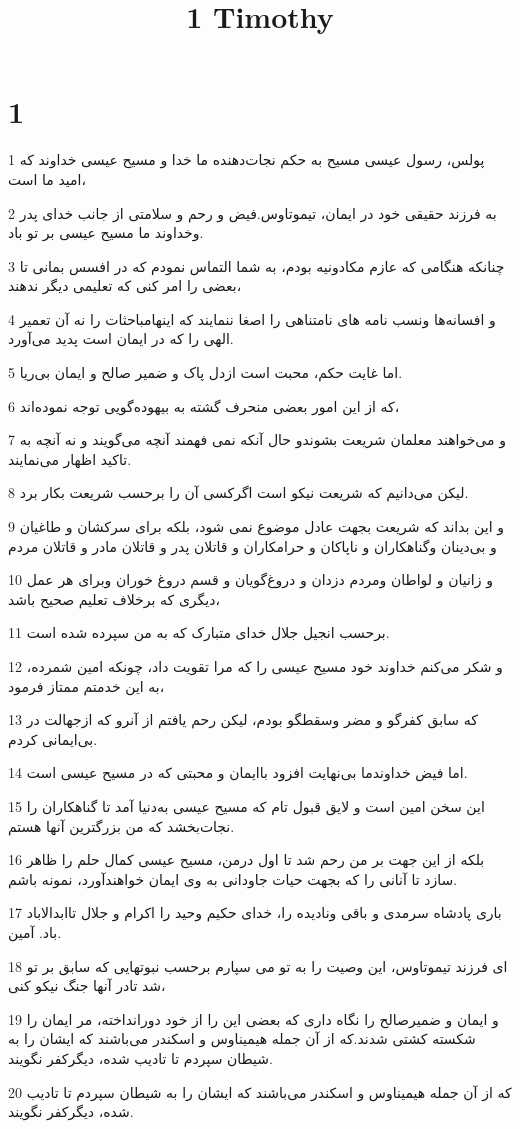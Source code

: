 

\title{1 Timothy}


\chapter{1}

\par 1 پولس، رسول عیسی مسیح به حکم نجات‌دهنده ما خدا و مسیح عیسی خداوند که امید ما است،
\par 2 به فرزند حقیقی خود در ایمان، تیموتاوس.فیض و رحم و سلامتی از جانب خدای پدر وخداوند ما مسیح عیسی بر تو باد.
\par 3 چنانکه هنگامی که عازم مکادونیه بودم، به شما التماس نمودم که در افسس بمانی تا بعضی را امر کنی که تعلیمی دیگر ندهند،
\par 4 و افسانه‌ها ونسب نامه های نامتناهی را اصغا ننمایند که اینهامباحثات را نه آن تعمیر الهی را که در ایمان است پدید می‌آورد.
\par 5 اما غایت حکم، محبت است ازدل پاک و ضمیر صالح و ایمان بی‌ریا.
\par 6 که از این امور بعضی منحرف گشته به بیهوده‌گویی توجه نموده‌اند،
\par 7 و می‌خواهند معلمان شریعت بشوندو حال آنکه نمی فهمند آنچه می‌گویند و نه آنچه به تاکید اظهار می‌نمایند.
\par 8 لیکن می‌دانیم که شریعت نیکو است اگرکسی آن را برحسب شریعت بکار برد.
\par 9 و این بداند که شریعت بجهت عادل موضوع نمی شود، بلکه برای سرکشان و طاغیان و بی‌دینان وگناهکاران و ناپاکان و حرامکاران و قاتلان پدر و قاتلان مادر و قاتلان مردم
\par 10 و زانیان و لواطان ومردم دزدان و دروغ‌گویان و قسم دروغ خوران وبرای هر عمل دیگری که برخلاف تعلیم صحیح باشد،
\par 11 برحسب انجیل جلال خدای متبارک که به من سپرده شده است.
\par 12 و شکر می‌کنم خداوند خود مسیح عیسی را که مرا تقویت داد، چونکه امین شمرده، به این خدمتم ممتاز فرمود،
\par 13 که سابق کفرگو و مضر وسقطگو بودم، لیکن رحم یافتم از آنرو که ازجهالت در بی‌ایمانی کردم.
\par 14 اما فیض خداوندما بی‌نهایت افزود با‌ایمان و محبتی که در مسیح عیسی است.
\par 15 این سخن امین است و لایق قبول تام که مسیح عیسی به‌دنیا آمد تا گناهکاران را نجات‌بخشد که من بزرگترین آنها هستم.
\par 16 بلکه از این جهت بر من رحم شد تا اول درمن، مسیح عیسی کمال حلم را ظاهر سازد تا آنانی را که بجهت حیات جاودانی به وی ایمان خواهند‌آورد، نمونه باشم.
\par 17 باری پادشاه سرمدی و باقی ونادیده را، خدای حکیم وحید را اکرام و جلال تاابدالاباد باد. آمین.
\par 18 ‌ای فرزند تیموتاوس، این وصیت را به تو می سپارم برحسب نبوتهایی که سابق بر تو شد تادر آنها جنگ نیکو کنی،
\par 19 و ایمان و ضمیرصالح را نگاه داری که بعضی این را از خود دورانداخته، مر ایمان را شکسته کشتی شدند.که از آن جمله هیمیناوس و اسکندر می‌باشند که ایشان را به شیطان سپردم تا تادیب شده، دیگرکفر نگویند.
\par 20 که از آن جمله هیمیناوس و اسکندر می‌باشند که ایشان را به شیطان سپردم تا تادیب شده، دیگرکفر نگویند.

